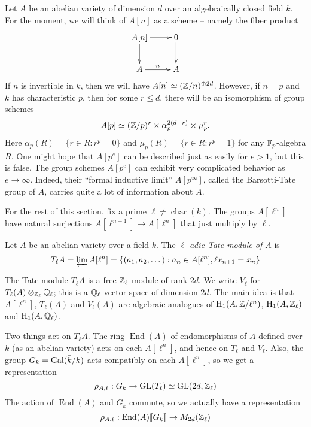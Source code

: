 \documentclass{article}
\begin{document}
Let $A$ be an abelian variety of dimension $d$ over an algebraically closed 
field $k$. For the moment, we will think of $A[n]$ as a scheme -- namely 
the fiber product 
\[\xymatrix{
  A[n] \ar[r] \ar[d] 
    & 0 \ar[d] \\
  A \ar[r]^-n 
    & A 
}\]
If $n$ is invertible in $k$, then we will have 
$A[n]\simeq (\mathbb{Z}/n)^{\oplus 2 d}$. However, if $n=p$ and $k$ has 
characteristic $p$, then for some $r\leqslant d$, 
there will be an isomorphism of group schemes 
\[
   A[p]\simeq (\mathbb{Z}/p)^r\times \alpha_p^{2(d-r)}\times \mu_p^r \text{.}
\]
Here $\alpha_p(R)=\{r\in R:r^p=0\}$ and $\mu_p(R)=\{r\in R:r^p=1\}$ for any 
$\mathbb{F}_p$-algebra $R$. One might hope that $A[p^e]$ can be described just as 
easily for $e>1$, but this is false. The group schemes $A[p^e]$ can exhibit 
very complicated behavior as $e\to \infty$. Indeed, their ``formal inductive 
limit'' $A[p^\infty]$, called the Barsotti-Tate group of $A$, carries quite a 
lot of information about $A$. 

For the rest of this section, fix a prime 
$\ell\ne \operatorname{char}(k)$. The groups $A[\ell^n]$ have 
natural surjections $A[\ell^{n+1}]\to A[\ell^n]$ that just multiply by 
$\ell$. 

\begin{definition}
Let $A$ be an abelian variety over a field $k$. The \emph{$\ell$-adic Tate 
module of $A$} is 
\[
  T_\ell A = \varprojlim A[\ell^n] = \{(a_1,a_2,\dots) : a_n\in A[\ell^n],\ell x_{n+1}=x_n\}
\]
\end{definition}

The Tate module $T_\ell A$ is a free $\mathbb{Z}_\ell$-module of rank $2 d$. We write 
$V_\ell$ for $T_\ell(A)\otimes_{\mathbb{Z}_\ell} \mathbb{Q}_\ell$; this is a 
$\mathbb{Q}_\ell$-vector space of dimension $2 d$. The main idea is that 
$A[\ell^n]$, $T_\ell(A)$ and $V_\ell(A)$ are algebraic analogues of 
$\operatorname{H}_1(A,\mathbb{Z}/\ell^n)$, $\operatorname{H}_1(A,\mathbb{Z}_\ell)$ and $\operatorname{H}_1(A,\mathbb{Q}_\ell)$. 

Two things act on $T_\ell A$. The ring $\operatorname{End}(A)$ of endomorphisms 
of $A$ defined over $k$ (as an abelian variety) acts on each $A[\ell^n]$, and 
hence on $T_\ell$ and $V_\ell$. Also, the group $G_k=\operatorname{Gal}(\bar k/k)$ acts 
compatibly on each $A[\ell^n]$, so we get a representation 
\[
  \rho_{A,\ell}:G_k\to \operatorname{GL}(T_\ell)\simeq \operatorname{GL}(2 d,\mathbb{Z}_\ell)
\]
The action of $\operatorname{End}(A)$ and $G_k$ commute, so we actually have a 
representation 
\[
  \rho_{A,\ell}:\operatorname{End}(A)\llbracket G_k\rrbracket \to M_{2 d}(\mathbb{Z}_\ell)
\]
\end{document}
